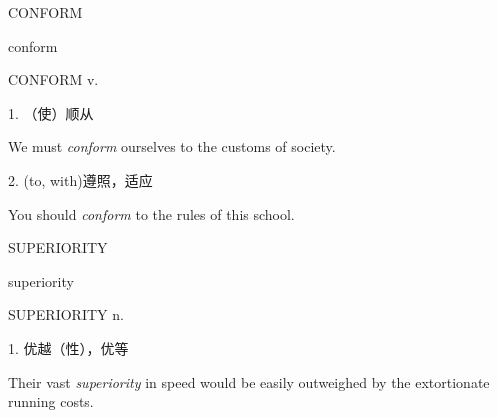 \begin{flashcard}{
CONFORM

conform
}
\begin{center}
CONFORM v. 
\end{center}
1. （使）顺从

We must \textit{conform} ourselves to the customs of society.

2. (to, with)遵照，适应

You should \textit{conform} to the rules of this school.

\end{flashcard}
\begin{flashcard}{
SUPERIORITY

superiority
}
\begin{center}
SUPERIORITY n. 
\end{center}
1. 优越（性），优等

Their vast \textit{superiority} in speed would be easily outweighed by the extortionate running costs.

\end{flashcard}

